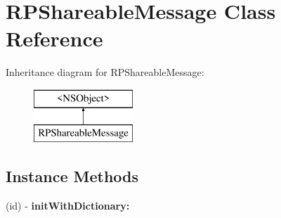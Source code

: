 \hypertarget{interface_r_p_shareable_message}{\section{R\-P\-Shareable\-Message Class Reference}
\label{interface_r_p_shareable_message}
}
Inheritance diagram for R\-P\-Shareable\-Message\-:\begin{figure}[H]
\begin{center}
\leavevmode
\includegraphics[height=2.000000cm]{interface_r_p_shareable_message}
\end{center}
\end{figure}
\subsection*{Instance Methods}
\begin{DoxyCompactItemize}
\item 
\hypertarget{interface_r_p_shareable_message_a633277fdde105006d1e6e3a1d6c39dbf}{(id) -\/ {\bfseries init\-With\-Dictionary\-:}}\label{interface_r_p_shareable_message_a633277fdde105006d1e6e3a1d6c39dbf}

\end{DoxyCompactItemize}
